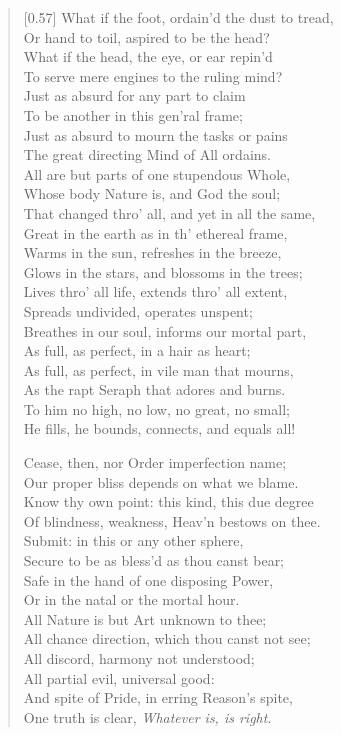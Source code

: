\begin{verse}[0.57\textwidth]
What if the foot, ordain'd the dust to tread,\\
Or hand to toil, aspired to be the head?\\
What if the head, the eye, or ear repin'd\\
To serve mere engines to the ruling mind?\\
Just as absurd for any part to claim\\
To be another in this gen'ral frame;\\
Just as absurd to mourn the tasks or pains\\
The great directing Mind of All ordains.\\
\vin All are but parts of one stupendous Whole,\\
Whose body Nature is, and God the soul;\\
That changed thro' all, and yet in all the same,\\
Great in the earth as in th' ethereal frame,\\
Warms in the sun, refreshes in the breeze,\\
Glows in the stars, and blossoms in the trees;\\
Lives thro' all life, extends thro' all extent,\\
Spreads undivided, operates unspent;\\
Breathes in our soul, informs our mortal part,\\
As full, as perfect, in a hair as heart;\\
As full, as perfect, in vile man that mourns,\\
As the rapt Seraph that adores and burns.\\
To him no high, no low, no great, no small;\\
He fills, he bounds, connects, and equals all!

Cease, then, nor Order imperfection name;\\
Our proper bliss depends on what we blame.\\
Know thy own point: this kind, this due degree\\
Of blindness, weakness, Heav'n bestows on thee.\\
Submit: in this or any other sphere,\\
Secure to be as bless'd as thou canst bear;\\
Safe in the hand of one disposing Power,\\
Or in the natal or the mortal hour.\\
All Nature is but Art unknown to thee;\\
All chance direction, which thou canst not see;\\
All discord, harmony not understood;\\
All partial evil, universal good:\\
And spite of Pride, in erring Reason's spite,\\
One truth is clear, \textit{Whatever is, is right}.
\end{verse}

